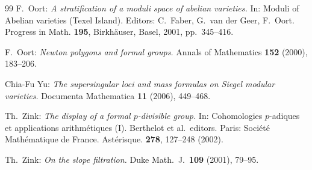 \documentclass[11pt]{amsart}
\numberwithin{equation}{section}
\theoremstyle{definition}
\theoremstyle{remark}
\begin{document}
\begin{thebibliography}{99}
 F.\ Oort:
{\sl A stratification of a moduli space
of abelian varieties.} In: Moduli of Abelian varieties (Texel Island).
Editors: C.\ Faber, G.\ van der Geer, F.\ Oort. Progress in Math.
\textbf{195}, Birkh\"auser, Basel, 2001, pp.\ 345--416.

 F.\ Oort: {\sl Newton polygons and formal groups.}
Annals of Mathematics \textbf{152} (2000), 183--206.

 Chia-Fu Yu:
{\sl The supersingular loci and mass formulas on Siegel modular varieties.}
Documenta Mathematica \textbf{11} (2006), 449--468.

Th.\ Zink:
{\sl The display of a formal $p$-divisible group.} In:
Cohomologies $p$-adiques et applications arithm\'etiques (I).
Berthelot et al.\ editors. Paris: Soci\'et\'e Math\'ematique de France. Ast\'erisque. {\bf 278}, 127--248 (2002).

 Th.\ Zink:
{\sl On the slope filtration.} Duke Math.\ J.\ \textbf{109} (2001), 79--95.


\end{thebibliography}
\end{document}
